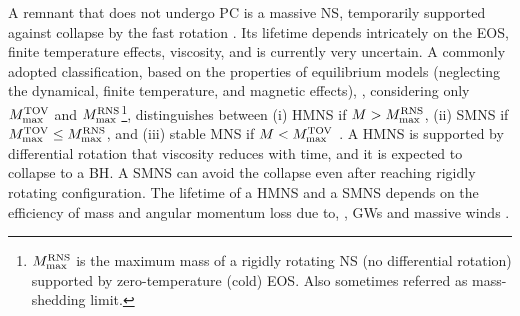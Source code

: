 A remnant that does not undergo \ac{PC} is a massive \ac{NS}, temporarily supported 
against collapse by the fast rotation  \citep{Baumgarte:1999cq,Rosswog:2001fh,Shibata:2006nm,Bernuzzi:2015opx}.
Its lifetime depends intricately on the \ac{EOS}, finite temperature effects, viscosity,
and is currently very uncertain.
A commonly adopted classification, based on the properties of equilibrium models (neglecting the 
dynamical, finite temperature, and magnetic effects), \ie, considering only 
$M_{\rm max}^{\rm TOV}$ and $M_{\rm max}^{\rm RNS}$\footnote{
    $M_{\rm max}^{\rm RNS}$ is the maximum mass of a rigidly rotating \ac{NS} (no differential 
    rotation) supported by zero-temperature (cold) \ac{EOS}. 
    Also sometimes referred as mass-shedding limit.
}, 
distinguishes between 
(i) \ac{HMNS} if $M>M_{\rm max}^{\rm RNS}$, 
(ii) \ac{SMNS} if $M_{\rm max}^{\rm TOV} \leq M_{\rm max}^{\rm RNS}$,
and (iii) stable \ac{MNS} if $M < M_{\rm max}^{\rm TOV}$ \citep[\eg][]{Baumgarte:1999cq}.
A \ac{HMNS} is supported by differential rotation that viscosity reduces with time,  
and it is expected to collapse to a \ac{BH}. A \ac{SMNS} can avoid the collapse 
even after reaching rigidly rotating configuration. The lifetime of a \ac{HMNS} and 
a \ac{SMNS} depends on the efficiency of mass and angular momentum loss 
due to, \eg, \acp{GW} and massive winds 
\citep{Radice:2018xqa}. 
%


